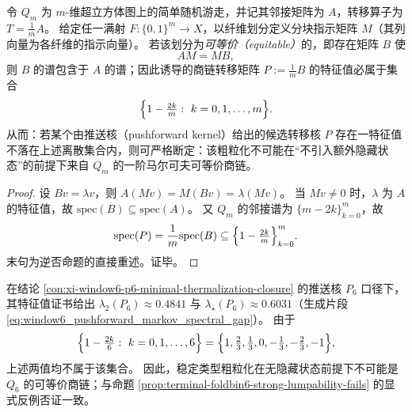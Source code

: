 \begin{theorem}\label{thm:window6-strong-lumpability-spectral-rigidity}
令 \(Q_m\) 为 \(m\)-维超立方体图上的简单随机游走，并记其邻接矩阵为 \(A\)，转移算子为 \(T=\frac{1}{m}A\)。
给定任一满射 \(F:\{0,1\}^m\to X\)，以纤维划分定义分块指示矩阵 \(M\)（其列向量为各纤维的指示向量）。
若该划分为\emph{可等价（equitable）}的，即存在矩阵 \(B\) 使
\[
AM=MB,
\]
则 \(B\) 的谱包含于 \(A\) 的谱；因此诱导的商链转移矩阵 \(P:=\frac{1}{m}B\) 的特征值必属于集合
\[
\Bigl\{1-\tfrac{2k}{m}:\ k=0,1,\dots,m\Bigr\}.
\]
从而：若某个由推送核（pushforward kernel）给出的候选转移核 \(P\) 存在一特征值不落在上述离散集合内，则可严格断定：该粗粒化不可能在“不引入额外隐藏状态”的前提下来自 \(Q_m\) 的一阶马尔可夫可等价商链。
\end{theorem}

\begin{proof}
设 \(Bv=\lambda v\)，则
\(
A(Mv)=M(Bv)=\lambda(Mv)
\)。
当 \(Mv\neq 0\) 时，\(\lambda\) 为 \(A\) 的特征值，故 \(\mathrm{spec}(B)\subseteq \mathrm{spec}(A)\)。
又 \(Q_m\) 的邻接谱为 \(\{m-2k\}_{k=0}^m\)，故
\[
\mathrm{spec}(P)=\frac{1}{m}\mathrm{spec}(B)\subseteq \Bigl\{1-\tfrac{2k}{m}\Bigr\}_{k=0}^m.
\]
末句为逆否命题的直接重述。证毕。
\end{proof}

\begin{corollary}\label{cor:window6-strong-lumpability-spectral-falsifier}
在结论 \ref{con:xi-window6-p6-minimal-thermalization-closure} 的推送核 \(P_6\) 口径下，其特征值证书给出
\(\lambda_2(P_6)\approx 0.4841\) 与 \(\lambda_\star(P_6)\approx 0.6031\)（生成片段 \eqref{eq:window6_pushforward_markov_spectral_gap}）。
由于
\[
\Bigl\{1-\tfrac{2k}{6}:\ k=0,1,\dots,6\Bigr\}
=\Bigl\{1,\tfrac23,\tfrac13,0,-\tfrac13,-\tfrac23,-1\Bigr\},
\]
上述两值均不属于该集合。
因此，稳定类型粗粒化在无隐藏状态前提下不可能是 \(Q_6\) 的可等价商链；与命题 \ref{prop:terminal-foldbin6-strong-lumpability-fails} 的显式反例否证一致。
\end{corollary}

\endinput
